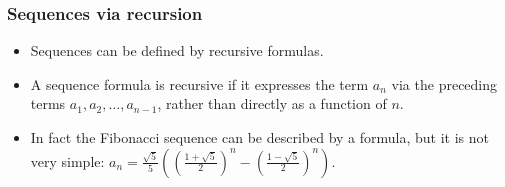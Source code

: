 \begin{frame}
\frametitle{Sequences via recursion}
\begin{itemize}
\item Sequences can be defined by recursive formulas.
\item<2-> A sequence formula is recursive if it expresses the term $a_n$ via the preceding terms $a_1, a_2,\dots, a_{n-1}$, rather than directly as a function of $n$.
\item<15->
In fact the Fibonacci sequence can be described by a formula, but it is not very simple: $\displaystyle a_n=\frac{ \sqrt{5}}{ 5} \left( \left(\frac{1+\sqrt{5 }}{2} \right)^n- \left(\frac{ 1-\sqrt{ 5}}{2}\right)^n\right) $.%

\end{itemize}
\end{frame}

